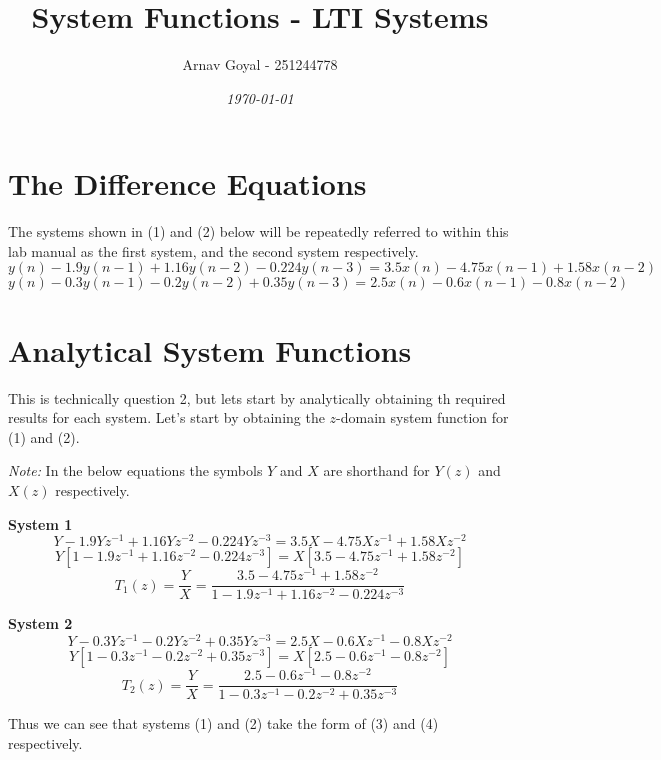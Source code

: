 \documentclass[]{report}
\title{\textbf{System Functions - LTI Systems}}
\date{\textit{\today}}
\author{Arnav Goyal - 251244778}
\begin{document}
	
\maketitle

\section*{The Difference Equations}
The systems shown in (1) and (2) below will be repeatedly referred to within this lab manual as the first system, and the second system respectively.
\begin{equation}
	y(n) - 1.9y(n-1) + 1.16y(n-2) - 0.224y(n-3) = 3.5x(n) - 4.75x(n-1) + 1.58x(n-2)
\end{equation}
\begin{equation}
	y(n) - 0.3 y(n-1) -0.2y(n-2) + 0.35y(n-3) = 2.5x(n) - 0.6x(n-1) - 0.8x(n-2)
\end{equation}

\section*{Analytical System Functions}
This is technically question 2, but lets start by analytically obtaining th required results for each system. Let's start by obtaining the $z$-domain system function for (1) and (2). 

\textit{Note:} In the below equations the symbols $Y$ and $X$ are shorthand for $Y(z)$ and $X(z)$ respectively.

\textbf{System 1}
	\[ Y - 1.9Yz^{-1} +1.16Yz^{-2} -0.224Yz^{-3} = 3.5X	- 4.75Xz^{-1} + 1.58Xz^{-2} \]
	\[ Y\left[1 - 1.9z^{-1} + 1.16z^{-2} - 0.224z^{-3}\right] = X\left[ 3.5 - 4.75z^{-1} + 1.58z^{-2} \right]	\]
	\begin{equation}
	T_1(z) = \frac{Y}{X} = \frac{3.5 - 4.75z^{-1} + 1.58z^{-2}}{1 - 1.9z^{-1} + 1.16z^{-2} - 0.224z^{-3}}
	\end{equation}

\textbf{System 2}
	\[	Y - 0.3Yz^{-1} - 0.2Yz^{-2} + 0.35Yz^{-3} = 2.5X - 0.6Xz^{-1} -0.8Xz^{-2}	\]
	\[	Y\left[1 - 0.3z^{-1} - 0.2z^{-2} + 0.35z^{-3}\right] = X\left[2.5 - 0.6z^{-1} -0.8z^{-2}\right]	\]
	\begin{equation}
	T_2(z) = \frac{Y}{X} = \frac{2.5 - 0.6z^{-1} -0.8z^{-2}}{1 - 0.3z^{-1} - 0.2z^{-2} + 0.35z^{-3}}
	\end{equation}
	
Thus we can see that systems (1) and (2) take the form of (3) and (4) respectively.
\end{document}
